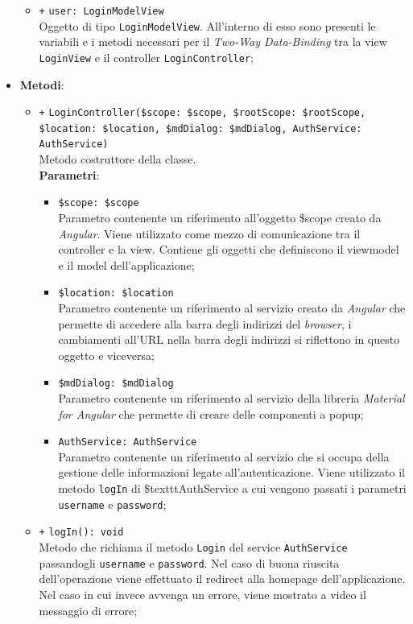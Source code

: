 \begin{itemize}
\begin{itemize}
		\item \texttt{+} \texttt{user: LoginModelView} \\
		Oggetto di tipo \texttt{LoginModelView}. All'interno di esso sono presenti le variabili e i metodi necessari per il \textit{Two-Way Data-Binding} tra la view \texttt{LoginView} e il controller \texttt{LoginController};
	\end{itemize}
	\item \textbf{Metodi}:
	\begin{itemize}
		\item \texttt{+} \texttt{LoginController(\$scope: \$scope, \$rootScope: \$rootScope, \$location: \$location, \$mdDialog: \$mdDialog, AuthService: AuthService)} \\
		Metodo costruttore della classe. \\
		\textbf{Parametri}:
			\begin{itemize}
				\item \texttt{\$scope: \$scope} \\
				Parametro contenente un riferimento all’oggetto \$scope creato da \textit{Angular}. Viene utilizzato come mezzo di comunicazione tra il controller e la view. Contiene gli oggetti che definiscono il viewmodel e il model dell’applicazione;
				\item \texttt{\$location: \$location} \\
				Parametro contenente un riferimento al servizio creato da \textit{Angular} che permette di accedere alla barra degli indirizzi del \textit{browser}, i cambiamenti all’URL nella barra degli indirizzi si riflettono in questo oggetto e viceversa;
				\item \texttt{\$mdDialog: \$mdDialog} \\
				Parametro contenente un riferimento al servizio della libreria \textit{Material for Angular} che permette di creare delle componenti a popup;
				\item \texttt{AuthService: AuthService} \\
				Parametro contenente un riferimento al servizio che si occupa della gestione delle informazioni legate all’autenticazione. Viene utilizzato il metodo \texttt{logIn} di \$texttt{AuthService} a cui vengono passati i parametri \texttt{username} e \texttt{password};
			\end{itemize}
		\item \texttt{+} \texttt{logIn(): void} \\
		Metodo che richiama il metodo \texttt{Login} del service \texttt{AuthService} passandogli \texttt{username} e \texttt{password}. Nel caso di buona riuscita dell'operazione viene effettuato il redirect alla homepage dell'applicazione. Nel caso in cui invece avvenga un errore, viene mostrato a video il messaggio di errore;

\end{itemize}
\end{itemize}
